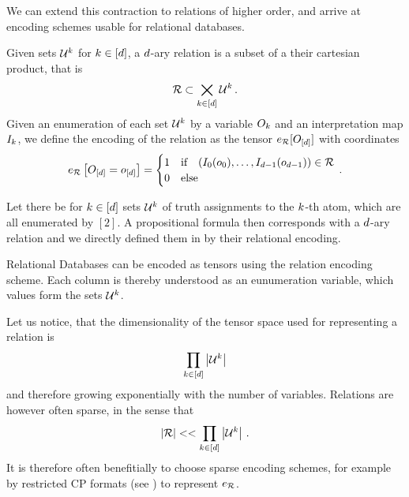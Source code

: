 
We can extend this contraction to relations of higher order, and arrive at encoding schemes usable for relational databases.

\begin{definition}\label{def:daryRelation}
	Given sets $\mathcal{U}^{k}$ for $k\in[d]$, a $d$-ary relation is a subset of a their cartesian product, that is
	\begin{align*}
		\mathcal{R} \subset\bigtimes_{k\in[d]} \mathcal{U}^{k} \, .
	\end{align*}
	Given an enumeration of each set $\mathcal{U}^{k}$ by a variable $O_{k}$ and an interpretation map $I_{k}$, we define the encoding of the relation as the tensor $e_{\mathcal{R}}[O_{[d]}]$ with coordinates
	\begin{align*}
		e_{\mathcal{R}}\left[O_{[d]}=o_{[d]}\right]
		= \begin{cases}
		1 & \text{if} \quad (I_{0}(o_{0}),\ldots,I_{d-1}(o_{d-1})) \in \mathcal{R} \\
		0 & \text{else}
		\end{cases} \, .
	\end{align*}
\end{definition}

\begin{example}
	Let there be for $k\in[d]$ sets $\mathcal{U}^{k}$ of truth assignments to the $k$-th atom, which are all enumerated by $[2]$.
	A propositional formula then corresponds with a $d$-ary relation and we directly defined them in  by their relational encoding.
\end{example}

\begin{example}
	Relational Databases can be encoded as tensors using the relation encoding scheme.
	Each column is thereby understood as an eunumeration variable, which values form the sets $\mathcal{U}^{k}$.
\end{example}

Let us notice, that the dimensionality of the tensor space used for representing a relation is
\begin{align*}
	\prod_{k\in[d]} \left|\mathcal{U}^{k}\right|
\end{align*}
and therefore growing exponentially with the number of variables.
Relations are however often sparse, in the sense that
\begin{align*}
	 \left|\mathcal{R}\right| << \prod_{k\in[d]} \left|\mathcal{U}^{k}\right| \, .
\end{align*}
It is therefore often benefitially to choose sparse encoding schemes, for example by restricted CP formats (see ) to represent $e_{\mathcal{R}}$.


